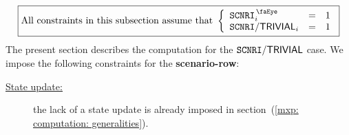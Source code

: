 \[
	\boxed{\text{All constraints in this subsection assume that }
	\left\{ \begin{array}{lcl}
		\isMxpScenario               _{i} & = & 1 \\
	    \mxpScenarioTrivialOperation _{i} & = & 1 \\
	\end{array} \right. }
\]
\noindent
The present section describes the computation for the $\texttt{SCNRI}\textsf{/}{\textsf{TRIVIAL}}$ case.
We impose the following constraints for the \textbf{scenario-row}:
\begin{description}
	\item[\underline{\underline{State update:}}]
		the lack of a state update is already imposed in
		section~(\ref{mxp: computation: generalities}).
\end{description}


